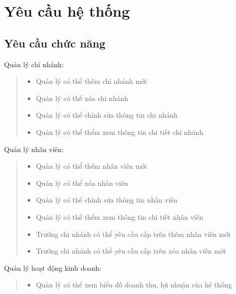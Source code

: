 \section{Yêu cầu hệ thống}
    \subsection{Yêu cầu chức năng}
        \hspace*{0.5cm}Quản lý chi nhánh:
        \begin{quote}
            \begin{itemize}
                \item Quản lý có thể thêm chi nhánh mới
                \item Quản lý có thể xóa chi nhánh
                \item Quản lý có thể chỉnh sửa thông tin chi nhánh
                \item Quản lý có thể thểm xem thông tin chi tiết chi nhánh
            \end{itemize}
        \end{quote}
        
        Quản lý nhân viên:
        \begin{quote}
            \begin{itemize}
                \item Quản lý có thể thêm nhân viên mới
                \item Quản lý có thể xóa nhân viên
                \item Quản lý có thể chỉnh sửa thông tin nhân viên
                \item Quản lý có thể thểm xem thông tin chi tiết nhân viên
                \item Trưởng chi nhánh có thể yêu cầu cấp trên thêm nhân viên mới
                \item Trưởng chi nhánh có thể yêu cầu cấp trên xóa nhân viên mới
            \end{itemize}
        \end{quote}
        
        Quản lý hoạt động kinh doanh:
        \begin{quote}
            \begin{itemize}
                \item Quản lý có thể xem biểu đồ doanh thu, lợi nhuận của hệ thống
            \end{itemize}
        \end{quote}
   
